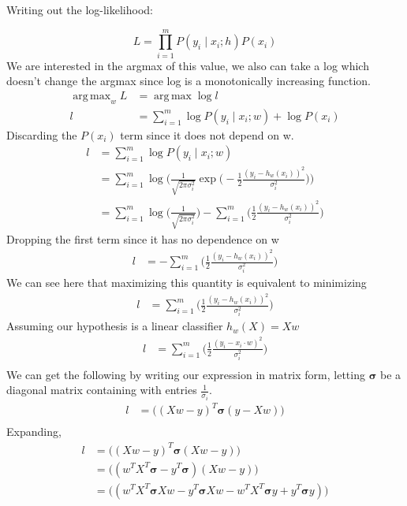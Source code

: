 \documentclass[12pt]{article}
\newenvironment{problem}[2][Problem]{\begin{trivlist}
\item[\hskip \labelsep {\bfseries #1}\hskip \labelsep {\bfseries #2.}]}{\end{trivlist}}
\DeclareMathOperator*{\argmax}{arg\,max}
\begin{document}
\begin{problem}{2.}
Writing out the log-likelihood:
\end{problem}
\[
    L = \prod_{i=1}^{m} P(y_i \mid x_i ; h ) P(x_i)
\]
We are interested in the argmax of this value, we 
also can take a log which doesn't change the argmax since log
is a monotonically increasing function.
\begin{align*}
    \argmax_w L &= \argmax \log l \\
    l &= \sum_{i=1}^{m} \log P(y_i \mid x_i ; w ) + \log P(x_i)
\end{align*}
Discarding the $P(x_i)$ term since it does not depend on w.
\begin{align*}
    l &= \sum_{i=1}^{m} \log P(y_i \mid x_i ; w ) \\
      &= \sum_{i=1}^{m} \log \Bigg( \frac{1}{\sqrt{2\pi\sigma_i^2}} \exp \Big(-\frac{1}{2} \frac{(y_i - h_w(x_i))^2}{\sigma_i^2} \Big) \Bigg) \\ 
      &= \sum_{i=1}^{m} \log \Big( \frac{1}{\sqrt{2\pi\sigma_i^2}} \Big) - \sum_{i=1}^{m} \Big(\frac{1}{2} \frac{(y_i - h_w(x_i))^2}{\sigma_i^2} \Big)
\end{align*}
Dropping the first term since it has no dependence on w
\begin{align*}
    l  &= -\sum_{i=1}^{m} \Big(\frac{1}{2} \frac{(y_i - h_w(x_i))^2}{\sigma_i^2} \Big)
\end{align*}
We can see here that maximizing this quantity is equivalent to minimizing
\begin{align*}
    l  &= \sum_{i=1}^{m} \Big(\frac{1}{2} \frac{(y_i - h_w(x_i))^2}{\sigma_i^2} \Big)
\end{align*}
Assuming our hypothesis is a linear classifier $h_w(X) = Xw$
\begin{align*}
    l &= \sum_{i=1}^{m} \Big(\frac{1}{2} \frac{(y_i - x_i \cdot w)^2}{\sigma_i^2} \Big)\\
\end{align*} 
We can get the following by writing our expression in matrix form, letting $\mathbf{\sigma}$ be
a diagonal matrix containing with entries $\frac{1}{\sigma_i}$.  
\begin{align*}
    l &= \Big((Xw - y)^T \mathbf{\sigma} (y - Xw) \Big)\\
\end{align*}
Expanding, 
\begin{align*}
    l &= \Big((Xw - y)^T \mathbf{\sigma} (Xw - y) \Big)\\
      &= \Big((w^T X^T \mathbf{\sigma} - y^T \mathbf{\sigma})(Xw - y) \Big)\\
      &= \Big((w^T X^T \mathbf{\sigma} Xw - y^T \mathbf{\sigma} Xw - w^T X^T \mathbf{\sigma}y + y^T \mathbf{\sigma} y) \Big)\\
\end{align*}
\end{document}
